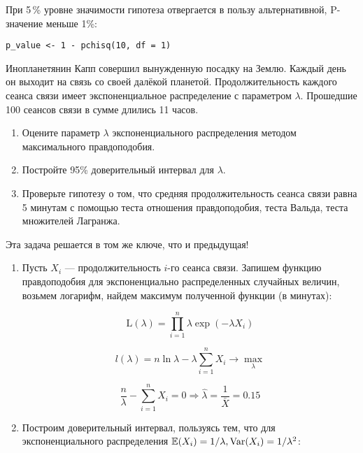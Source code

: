 \begin{problem}
\begin{sol}
\begin{enumerate}
При 5\,\% уровне значимости гипотеза отвергается в пользу альтернативной, P-значение меньше 1\%:
\begin{verbatim}
p_value <- 1 - pchisq(10, df = 1)
\end{verbatim}

\end{enumerate}

\end{sol}
\end{problem}





\begin{problem}
Инопланетянин Капп совершил вынужденную посадку на Землю. Каждый день он выходит на связь со своей далёкой планетой. Продолжительность каждого сеанса связи имеет экспоненциальное распределение с параметром $\lambda$. Прошедшие 100 сеансов связи в сумме длились 11 часов.
\begin{enumerate}
\item Оцените параметр $\lambda$ экспоненциального распределения методом максимального правдоподобия.
\item Постройте 95\% доверительный интервал для $\lambda$.
\item Проверьте гипотезу о том, что средняя продолжительность сеанса связи равна 5 минутам с помощью теста отношения правдоподобия, теста Вальда, теста множителей Лагранжа.
\end{enumerate}


\begin{sol}
Эта задача решается в том же ключе, что и предыдущая!

\begin{enumerate}
\item Пусть $X_i$ — продолжительность $i$-го сеанса связи. Запишем функцию правдоподобия для экспоненциально распределенных случайных величин, возьмем логарифм, найдем максимум полученной функции (в минутах):

\[\text{L}(\lambda) = \prod_{i=1}^n \lambda \exp(-\lambda X_i)\]

\[l(\lambda) = n \ln \lambda - \lambda \sum_{i=1}^n X_i \to \max_\lambda\]

\[\frac{n}{\lambda} - \sum_{i=1}^{n}X_i = 0 \Rightarrow \hat{\lambda} = \frac{1}{\bar{X}}=0.15\]

\item Построим доверительный интервал, пользуясь тем, что для экспоненциального распределения $\mathbb{E}(X_i) = 1/\lambda, \operatorname{Var}(X_i) = 1/\lambda^2$:


\end{enumerate}
\end{sol}
\end{problem}
